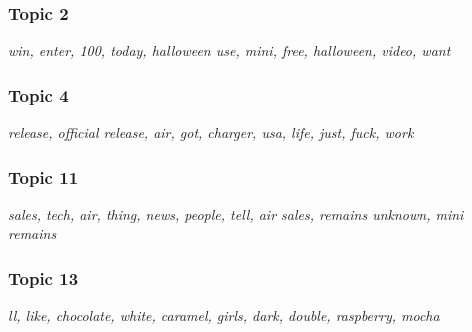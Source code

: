 \subsubsection{Topic 2}
\label{sec:topic_2}
\textit{win, enter, 100, today, halloween use, mini, free, halloween, video, want}

\subsubsection{Topic 4}
\label{sec:topic_4}
\textit{release, official release, air, got, charger, usa, life, just, fuck, work}

\subsubsection{Topic 11}
\label{sec:topic_11}
\textit{sales, tech, air, thing, news, people, tell, air sales, remains unknown, mini remains}

\subsubsection{Topic 13}
\label{sec:topic_13}
\textit{ll, like, chocolate, white, caramel, girls, dark, double, raspberry, mocha}

